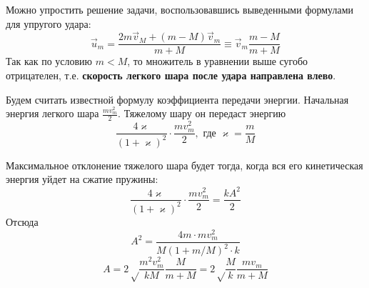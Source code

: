 \documentclass[a5paper,10pt]{article}
\begin{document}
Можно упростить решение задачи, воспользовавшись выведенными формулами для упругого удара:
\begin{equation}
    \vec{u}_{m}=\frac{2m\vec{v}_{M}+(m-M)\vec{v}_{m}}{m+M}\equiv
    \vec{v}_m\frac{m-M}{m+M}
\end{equation}
Так как по условию $m<M$, то множитель в уравнении выше сугобо отрицателен, т.е. \textbf{скорость легкого шара после удара направлена влево}.

Будем считать известной формулу коэффициента передачи энергии. Начальная энергия легкого шара $\frac{mv_m^2}{2}$. Тяжелому шару он передаст энергию
\begin{equation}
    \frac{4\varkappa}{(1+\varkappa)^2}\cdot \frac{mv_m^2}{2}, \text{ где } \varkappa=\frac{m}{M}
\end{equation}

Максимальное отклонение тяжелого шара будет тогда, когда вся его кинетическая энергия уйдет на сжатие пружины:
\begin{equation}
    \frac{4\varkappa}{(1+\varkappa)^2}\cdot \frac{mv_m^2}{2}=\frac{kA^2}{2}
\end{equation}
Отсюда
\begin{equation}
    A^2=\frac{4m\cdot mv_m^2}{M(1+m/M)^2\cdot k}
\end{equation}
\begin{equation}
    A=2\sqrt\frac{m^2v_m^2}{kM}\frac{M}{m+M}=2\sqrt\frac{M}{k}\frac{mv_m}{m+M}
\end{equation}
\end{document}

